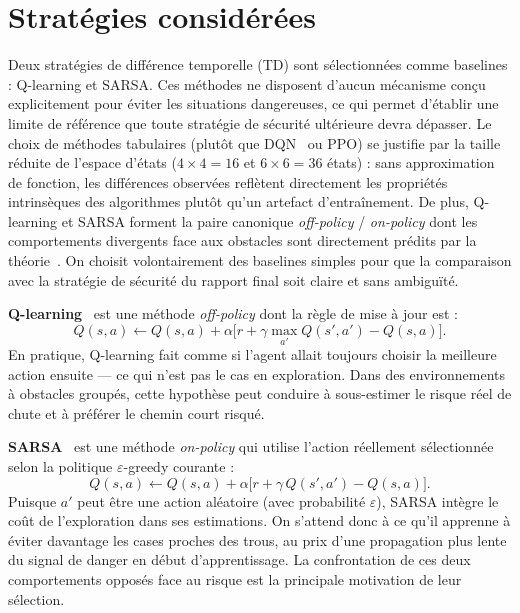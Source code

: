 \documentclass{article}
\begin{document}
\section{Stratégies considérées}

Deux stratégies de différence temporelle (TD) sont sélectionnées comme baselines : Q-learning et SARSA. Ces méthodes ne disposent d'aucun mécanisme conçu explicitement pour éviter les situations dangereuses, ce qui permet d'établir une limite de référence que toute stratégie de sécurité ultérieure devra dépasser. Le choix de méthodes tabulaires (plutôt que DQN~\citep{mnih2015} ou PPO) se justifie par la taille réduite de l'espace d'états ($4\times4 = 16$ et $6\times6 = 36$ états) : sans approximation de fonction, les différences observées reflètent directement les propriétés intrinsèques des algorithmes plutôt qu'un artefact d'entraînement. De plus, Q-learning et SARSA forment la paire canonique \textit{off-policy} / \textit{on-policy} dont les comportements divergents face aux obstacles sont directement prédits par la théorie~\citep{sutton2018}. On choisit volontairement des baselines simples pour que la comparaison avec la stratégie de sécurité du rapport final soit claire et sans ambiguïté.

\textbf{Q-learning}~\citep{watkins1992} est une méthode \textit{off-policy} dont la règle de mise à jour est :
\begin{equation}
  Q(s, a) \leftarrow Q(s, a) + \alpha \bigl[r + \gamma \max_{a'} Q(s', a') - Q(s, a)\bigr].
\end{equation}
En pratique, Q-learning fait comme si l'agent allait toujours choisir la meilleure action ensuite — ce qui n'est pas le cas en exploration. Dans des environnements à obstacles groupés, cette hypothèse peut conduire à sous-estimer le risque réel de chute et à préférer le chemin court risqué.

\textbf{SARSA}~\citep{rummery1994} est une méthode \textit{on-policy} qui utilise l'action réellement sélectionnée selon la politique $\varepsilon$-greedy courante :
\begin{equation}
  Q(s, a) \leftarrow Q(s, a) + \alpha \bigl[r + \gamma\, Q(s', a') - Q(s, a)\bigr].
\end{equation}
Puisque $a'$ peut être une action aléatoire (avec probabilité $\varepsilon$), SARSA intègre le coût de l'exploration dans ses estimations. On s'attend donc à ce qu'il apprenne à éviter davantage les cases proches des trous, au prix d'une propagation plus lente du signal de danger en début d'apprentissage. La confrontation de ces deux comportements opposés face au risque est la principale motivation de leur sélection.
\end{document}
